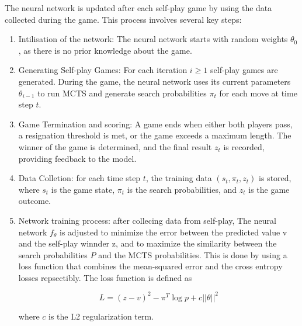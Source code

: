 The neural network is updated after each self-play game by using the data
collected during the game. This process involves several key steps:
\begin{enumerate}
    \item Intilisation of the network: The neural network starts with random weights
          $\theta_0$, as there is no prior knowledge about the game.
    \item Generating Self-play Games: For each iteration $i \geq 1$ self-play games are
          generated. During the game, the neural network uses its current parameters
          $\theta_{i - 1}$ to run MCTS and generate search probabilities $\pi_t$ for each
          move at time step $t$.
    \item Game Termination and scoring: A game ends when either both players pass, a
          resignation threshold is met, or the game exceeds a maximum length. The winner
          of the game is determined, and the final result $z_t$ is recorded, providing
          feedback to the model.
    \item Data Colletion: for each time step $t$, the training data $(s_t, \pi_t, z_t)$
          is stored, where $s_t$ is the game state, $\pi_t$ is the search probabilities,
          and $z_t$ is the game outcome.
    \item Network training process: after collecing data from self-play, The neural
          network $f_\theta$ is adjusted to minimize the error between the predicted
          value v and the self-play winnder z, and to maximize the similarity between the
          search probabilities $P$ and the MCTS probabilities. This is done by using a
          loss function that combines the mean-squared error and the cross entropy losses
          repsectibly. The loss function is defined as

          \begin{equation}
              L = (z - v)^2 - \pi^T \log p + c||\theta||^2
          \end{equation}

          where $c$ is the L2 regularization term.

\end{enumerate}

